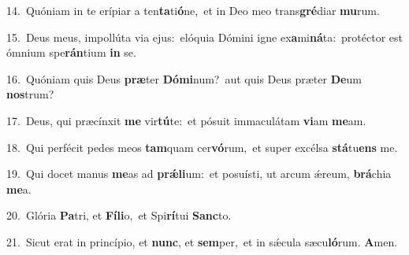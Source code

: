 {\numbfont\textcolor{\numbcolor}{14.}}~Quóniam in te erípiar a ten\-\textbf{ta}\-ti\-\textbf{ó}\-ne,~\star et in Deo meo trans\-\textbf{gré}\-diar \textbf{mu}\-rum.\par
{\numbfont\textcolor{\numbcolor}{15.}}~Deus meus, impollúta via ejus:~\dagger elóquia Dómini igne ex\-\textbf{a}\-mi\-\textbf{ná}\-ta:~\star protéctor est ómnium spe\-\textbf{rán}\-tium \textbf{in} se.\par
{\numbfont\textcolor{\numbcolor}{16.}}~Quóniam quis Deus \textbf{præ}\-ter \textbf{Dó}\-\textbf{mi}num?~\star aut quis Deus præter \textbf{De}\-um \textbf{nos}\-trum?\par
{\numbfont\textcolor{\numbcolor}{17.}}~Deus, qui præcínxit \textbf{me} vir\-\textbf{tú}\-te:~\star et pósuit immaculátam \textbf{vi}\-am \textbf{me}\-am.\par
{\numbfont\textcolor{\numbcolor}{18.}}~Qui perfécit pedes meos \textbf{tam}\-quam cer\-\textbf{vó}\-rum,~\star et super excélsa \textbf{stá}\-tu\textbf{ens} me.\par
{\numbfont\textcolor{\numbcolor}{19.}}~Qui docet manus \textbf{me}\-as ad \textbf{prǽ}\-\textbf{li}um:~\star et posuísti, ut arcum ǽreum, \textbf{brá}\-chia \textbf{me}\-a.\par
{\numbfont\textcolor{\numbcolor}{20.}}~Glória \textbf{Pa}\-tri, et \textbf{Fí}\-\textbf{li}o,~\star et Spi\-\textbf{rí}\-tui \textbf{Sanc}\-to.\par
{\numbfont\textcolor{\numbcolor}{21.}}~Sicut erat in princípio, et \textbf{nunc}\-, et \textbf{sem}\-per,~\star et in sǽcula sæcu\-\textbf{ló}\-rum. \textbf{A}\-men.\par
